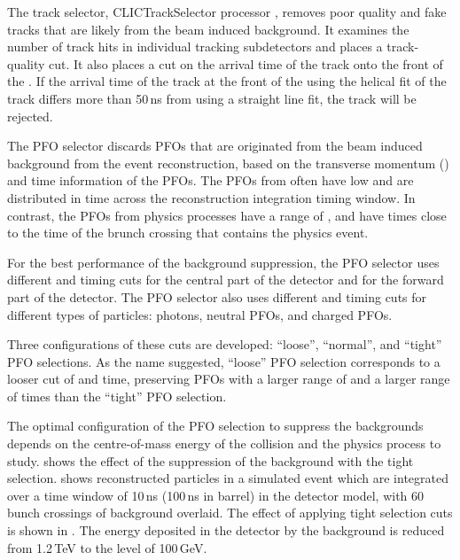 The track selector, CLICTrackSelector processor \cite{Marshall:2012ry},  removes poor quality and fake tracks that are  likely from the beam induced background. It examines the number of track hits in individual tracking subdetectors and places a track-quality cut. It also places a cut on the arrival time of the track onto the front of the \ECAL. If the arrival time of the track at the front of the \ECAL using the helical fit of the track differs more than 50\,ns from using a straight line fit, the track will be rejected.


The PFO selector \cite{Marshall:2012ry} discards PFOs that are originated from the beam induced background from the event reconstruction, based on the transverse momentum (\pT) and time information of the PFOs. The PFOs from \ggHad often have low \pT and are distributed in time across the reconstruction integration timing window. In contrast, the PFOs from physics processes have a range of \pT, and have times close to the time of the brunch crossing that contains the physics event.


For the best performance of the background suppression, the PFO selector uses different \pT and timing cuts for the central part of the detector and for the forward part of the detector. The PFO selector also uses different \pT and timing cuts for different types of particles: photons, neutral PFOs, and charged PFOs.

Three configurations of these cuts are developed: ``loose'', ``normal'', and ``tight'' PFO selections. As the name suggested, ``loose'' PFO selection corresponds to a looser cut of \pT and time, preserving PFOs with a larger range of \pT and a larger range of  times than the ``tight'' PFO selection.

The optimal configuration of the PFO selection to suppress the backgrounds depends on the centre-of-mass energy of the collision and the physics process to study.  shows the effect of the suppression of the background with the tight \PFO selection.   shows reconstructed particles  in a simulated \HepProcess{\Pep\Pem \to \PHiggs\PHiggs \to \Ptop\APbottom\Pbottom\APtop} event which are integrated over a time window of 10\,ns (100\,ns in \HCAL barrel) in the \CLICILD detector model, with 60 bunch crossings of \ggHad background overlaid. The effect of applying tight \PFO selection cuts is shown in . The energy deposited in the detector by the background is reduced from 1.2\,TeV to the level of 100\,GeV.



